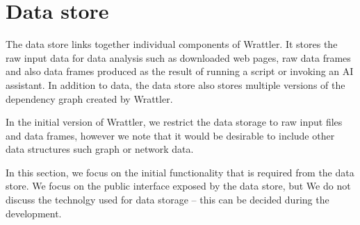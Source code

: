 \documentclass[sigplan,preprint,10pt]{acmart}\settopmatter{printfolios=true,printccs=false,printacmref=false}
\theoremstyle{plain}
\theoremstyle{definition}
\begin{document}
{

\section{Data store}
\label{sec:datastore}

The data store links together individual components of Wrattler. It stores the raw input
data for data analysis such as downloaded web pages, raw data frames and also data frames
produced as the result of running a script or invoking an AI assistant. In addition to data,
the data store also stores multiple versions of the dependency graph created by Wrattler.

In the initial version of Wrattler, we restrict the data storage to raw input files and
data frames, however we note that it would be desirable to include other data structures
such graph or network data.

In this section, we focus on the initial functionality that is required from the data store.
We focus on the public interface exposed by the data store, but We do not discuss the technolgy
used for data storage -- this can be decided during the development.

}
\end{document}
